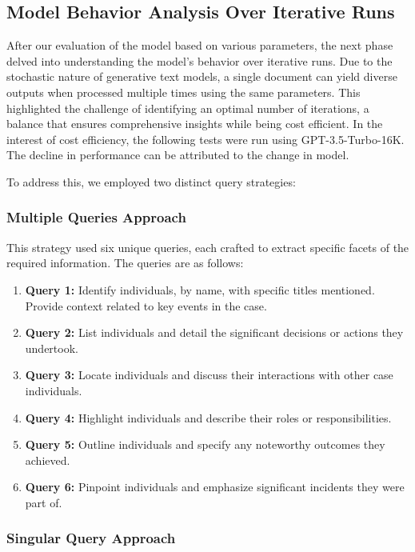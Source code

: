 \documentclass{article}
\begin{document}
\subsection{Model Behavior Analysis Over Iterative Runs}

After our evaluation of the model based on various parameters, the next phase delved into understanding the model's behavior over iterative runs. Due to the stochastic nature of generative text models, a single document can yield diverse outputs when processed multiple times using the same parameters. This highlighted the challenge of identifying an optimal number of iterations, a balance that ensures comprehensive insights while being cost efficient. In the interest of cost efficiency, the following tests were run using GPT-3.5-Turbo-16K. The decline in performance can be attributed to the change in model. 

To address this, we employed two distinct query strategies:

\subsubsection{Multiple Queries Approach}

This strategy used six unique queries, each crafted to extract specific facets of the required information. The queries are as follows:

\begin{enumerate}
    \item \textbf{Query 1:} Identify individuals, by name, with specific titles mentioned. Provide context related to key events in the case.
    \item \textbf{Query 2:} List individuals and detail the significant decisions or actions they undertook.
    \item \textbf{Query 3:} Locate individuals and discuss their interactions with other case individuals.
    \item \textbf{Query 4:} Highlight individuals and describe their roles or responsibilities.
    \item \textbf{Query 5:} Outline individuals and specify any noteworthy outcomes they achieved.
    \item \textbf{Query 6:} Pinpoint individuals and emphasize significant incidents they were part of.
\end{enumerate}

\subsubsection{Singular Query Approach}
\end{document}
